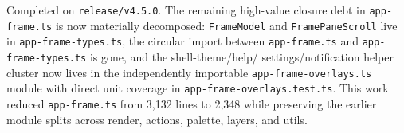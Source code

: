 Completed on \texttt{r\allowbreak{}e\allowbreak{}l\allowbreak{}e\allowbreak{}a\allowbreak{}s\allowbreak{}e\allowbreak{}/\allowbreak{}v\allowbreak{}4\allowbreak{}.\allowbreak{}5\allowbreak{}.\allowbreak{}0}. The remaining high-value closure debt in \texttt{a\allowbreak{}p\allowbreak{}p\allowbreak{}-\allowbreak{}f\allowbreak{}r\allowbreak{}a\allowbreak{}m\allowbreak{}e\allowbreak{}.\allowbreak{}t\allowbreak{}s} is now materially decomposed: \texttt{F\allowbreak{}r\allowbreak{}a\allowbreak{}m\allowbreak{}e\allowbreak{}M\allowbreak{}o\allowbreak{}d\allowbreak{}e\allowbreak{}l} and \texttt{F\allowbreak{}r\allowbreak{}a\allowbreak{}m\allowbreak{}e\allowbreak{}P\allowbreak{}a\allowbreak{}n\allowbreak{}e\allowbreak{}S\allowbreak{}c\allowbreak{}r\allowbreak{}o\allowbreak{}l\allowbreak{}l} live in \texttt{a\allowbreak{}p\allowbreak{}p\allowbreak{}-\allowbreak{}f\allowbreak{}r\allowbreak{}a\allowbreak{}m\allowbreak{}e\allowbreak{}-\allowbreak{}t\allowbreak{}y\allowbreak{}p\allowbreak{}e\allowbreak{}s\allowbreak{}.\allowbreak{}t\allowbreak{}s}, the circular import between \texttt{a\allowbreak{}p\allowbreak{}p\allowbreak{}-\allowbreak{}f\allowbreak{}r\allowbreak{}a\allowbreak{}m\allowbreak{}e\allowbreak{}.\allowbreak{}t\allowbreak{}s} and \texttt{a\allowbreak{}p\allowbreak{}p\allowbreak{}-\allowbreak{}f\allowbreak{}r\allowbreak{}a\allowbreak{}m\allowbreak{}e\allowbreak{}-\allowbreak{}t\allowbreak{}y\allowbreak{}p\allowbreak{}e\allowbreak{}s\allowbreak{}.\allowbreak{}t\allowbreak{}s} is gone, and the shell-theme/help/ settings/notification helper cluster now lives in the independently importable \texttt{a\allowbreak{}p\allowbreak{}p\allowbreak{}-\allowbreak{}f\allowbreak{}r\allowbreak{}a\allowbreak{}m\allowbreak{}e\allowbreak{}-\allowbreak{}o\allowbreak{}v\allowbreak{}e\allowbreak{}r\allowbreak{}l\allowbreak{}a\allowbreak{}y\allowbreak{}s\allowbreak{}.\allowbreak{}t\allowbreak{}s} module with direct unit coverage in \texttt{a\allowbreak{}p\allowbreak{}p\allowbreak{}-\allowbreak{}f\allowbreak{}r\allowbreak{}a\allowbreak{}m\allowbreak{}e\allowbreak{}-\allowbreak{}o\allowbreak{}v\allowbreak{}e\allowbreak{}r\allowbreak{}l\allowbreak{}a\allowbreak{}y\allowbreak{}s\allowbreak{}.\allowbreak{}t\allowbreak{}e\allowbreak{}s\allowbreak{}t\allowbreak{}.\allowbreak{}t\allowbreak{}s}. This work reduced \texttt{a\allowbreak{}p\allowbreak{}p\allowbreak{}-\allowbreak{}f\allowbreak{}r\allowbreak{}a\allowbreak{}m\allowbreak{}e\allowbreak{}.\allowbreak{}t\allowbreak{}s} from 3,132 lines to 2,348 while preserving the earlier module splits across render, actions, palette, layers, and utils.

